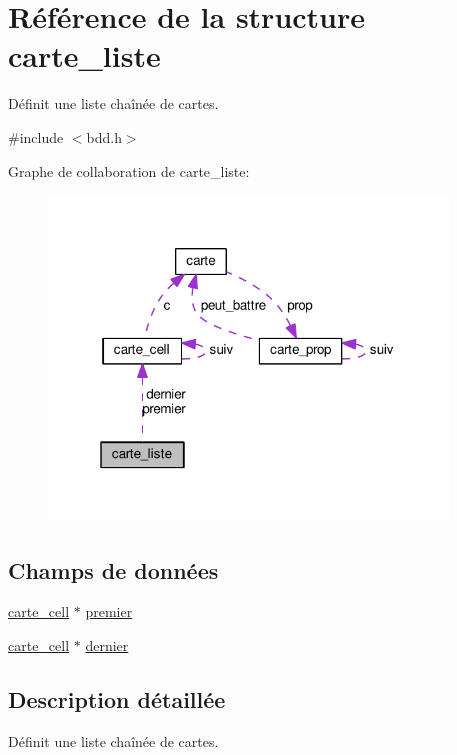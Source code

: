 \hypertarget{structcarte__liste}{}\section{Référence de la structure carte\+\_\+liste}
\label{structcarte__liste}


Définit une liste chaînée de cartes.  




{\ttfamily \#include $<$bdd.\+h$>$}



Graphe de collaboration de carte\+\_\+liste\+:\nopagebreak
\begin{figure}[H]
\begin{center}
\leavevmode
\includegraphics[width=301pt]{structcarte__liste__coll__graph}
\end{center}
\end{figure}
\subsection*{Champs de données}
\begin{DoxyCompactItemize}
\item 
\hyperlink{structcarte__cell}{carte\+\_\+cell} $\ast$ \hyperlink{structcarte__liste_aab2e8cf4d231e6f335d4dc99343d1421}{premier}
\item 
\hyperlink{structcarte__cell}{carte\+\_\+cell} $\ast$ \hyperlink{structcarte__liste_abeffe6f9b0cfe0111b785b92ac2af410}{dernier}
\end{DoxyCompactItemize}


\subsection{Description détaillée}
Définit une liste chaînée de cartes. 

